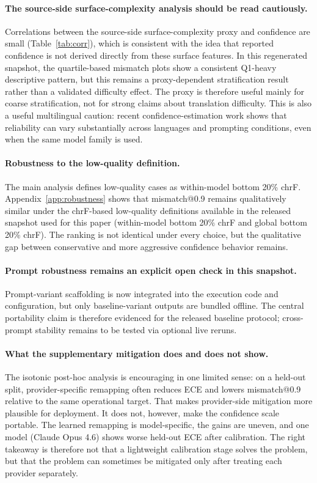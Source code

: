 \documentclass[10pt,conference]{IEEEtran}
\begin{document}
\paragraph{The source-side surface-complexity analysis should be read cautiously.}
Correlations between the source-side surface-complexity proxy and confidence are small (Table~\ref{tab:corr}), which is consistent with the idea that reported confidence is not derived directly from these surface features. In this regenerated snapshot, the quartile-based mismatch plots show a consistent Q1-heavy descriptive pattern, but this remains a proxy-dependent stratification result rather than a validated difficulty effect. The proxy is therefore useful mainly for coarse stratification, not for strong claims about translation difficulty. This is also a useful multilingual caution: recent confidence-estimation work shows that reliability can vary substantially across languages and prompting conditions, even when the same model family is used.

\paragraph{Robustness to the low-quality definition.}
The main analysis defines low-quality cases as within-model bottom 20\% chrF. Appendix~\ref{app:robustness} shows that mismatch@0.9 remains qualitatively similar under the chrF-based low-quality definitions available in the released snapshot used for this paper (within-model bottom 20\% chrF and global bottom 20\% chrF). The ranking is not identical under every choice, but the qualitative gap between conservative and more aggressive confidence behavior remains.

\paragraph{Prompt robustness remains an explicit open check in this snapshot.}
Prompt-variant scaffolding is now integrated into the execution code and configuration, but only baseline-variant outputs are bundled offline. The central portability claim is therefore evidenced for the released baseline protocol; cross-prompt stability remains to be tested via optional live reruns.

\paragraph{What the supplementary mitigation does and does not show.}
The isotonic post-hoc analysis is encouraging in one limited sense: on a held-out split, provider-specific remapping often reduces ECE and lowers mismatch@0.9 relative to the same operational target. That makes provider-side mitigation more plausible for deployment. It does not, however, make the confidence scale portable. The learned remapping is model-specific, the gains are uneven, and one model (Claude Opus 4.6) shows worse held-out ECE after calibration. The right takeaway is therefore not that a lightweight calibration stage solves the problem, but that the problem can sometimes be mitigated only after treating each provider separately.
\end{document}
